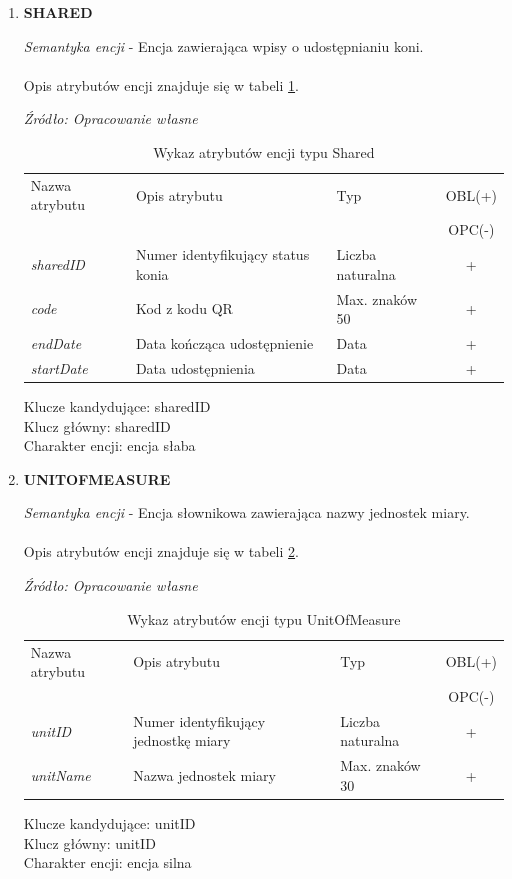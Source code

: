 \documentclass[12pt,oneside]{report}
\begin{document}
\begin{enumerate}[start=10,label={\bfseries ENC$\backslash$\arabic*}]
\item \textbf{SHARED}

\textit{Semantyka encji} - Encja zawierająca wpisy o udostępnianiu koni.
			\\ \\
Opis atrybutów encji znajduje się w tabeli \ref{SharedAtribute}.

\begin{table}[H]
	\caption{Wykaz atrybutów encji typu Shared }
	\textit{Źródło: Opracowanie własne}
	\label{SharedAtribute}
	\centering
	\begin{tabular}{|l|l|l|c|}
		\hline
		Nazwa atrybutu & Opis atrybutu & Typ & OBL(+) \\
		& & &  OPC(-) \\
		\hline
		\textit{sharedID} & Numer identyfikujący status konia & Liczba naturalna & + \\
		\hline
		\textit{code} &  Kod z kodu QR & Max. znaków 50 & + \\
		\hline
		\textit{endDate} &  Data kończąca udostępnienie & Data & + \\
		\hline
		\textit{startDate} &  Data udostępnienia & Data & + \\
		\hline
	\end{tabular}
\end{table}
Klucze kandydujące: sharedID \\
Klucz główny: sharedID \\
Charakter encji: encja słaba \\


\item \textbf{UNITOFMEASURE}

\textit{Semantyka encji} - Encja słownikowa zawierająca nazwy jednostek miary.
			\\ \\
Opis atrybutów encji znajduje się w tabeli \ref{UnitOfMeasure}.

\begin{table}[H]
	\caption{Wykaz atrybutów encji typu UnitOfMeasure }
	\textit{Źródło: Opracowanie własne}
	\label{UnitOfMeasure}
	\centering
	\begin{tabular}{|l|l|l|c|}
		\hline
		Nazwa atrybutu & Opis atrybutu & Typ & OBL(+) \\
		& & &  OPC(-) \\
		\hline
		\textit{unitID} & Numer identyfikujący jednostkę miary & Liczba naturalna & + \\
		\hline
		\textit{unitName} & Nazwa jednostek miary & Max. znaków 30 & + \\
		\hline
	\end{tabular}
\end{table}
Klucze kandydujące: unitID \\
Klucz główny: unitID \\
Charakter encji: encja silna \\


\end{enumerate}
\end{document}
